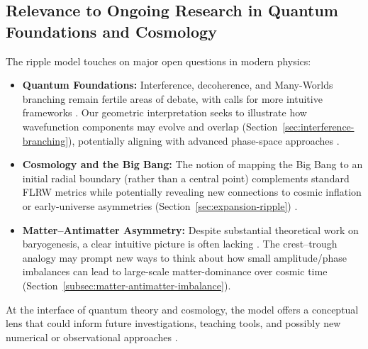 \documentclass{article}
\begin{document}
\subsection{Relevance to Ongoing Research in Quantum Foundations and Cosmology}
\label{subsec:relevance-research}
The ripple model touches on major open questions in modern physics:
\begin{itemize}
  \item \textbf{Quantum Foundations:} Interference, decoherence, and 
        Many-Worlds branching remain fertile areas of debate, with 
        calls for more intuitive frameworks \cite{Bell1964, Zurek1982}. 
        Our geometric interpretation seeks to illustrate how wavefunction 
        components may evolve and overlap (Section~\ref{sec:interference-branching}), 
        potentially aligning with advanced phase-space approaches \cite{wigner1932, husimi1940some}.
  \item \textbf{Cosmology and the Big Bang:} The notion of mapping 
        the Big Bang to an initial radial boundary (rather than a central 
        point) complements standard FLRW metrics \cite{misner1973} while potentially 
        revealing new connections to cosmic inflation or early-universe asymmetries 
        (Section~\ref{sec:expansion-ripple}) \cite{Guth1981, Linde1983}.
  \item \textbf{Matter--Antimatter Asymmetry:} Despite substantial 
        theoretical work on baryogenesis, a clear intuitive picture 
        is often lacking \cite{kolbTurner1990, Sakharov1967}. The crest--trough analogy 
        may prompt new ways to think about how small amplitude/phase imbalances 
        can lead to large-scale matter-dominance over cosmic time 
        (Section~\ref{subsec:matter-antimatter-imbalance}).
\end{itemize}
At the interface of quantum theory and cosmology, the model offers a 
conceptual lens that could inform future investigations, teaching tools, 
and possibly new numerical or observational approaches \cite{carroll2010, penrose2004}.
\end{document}
